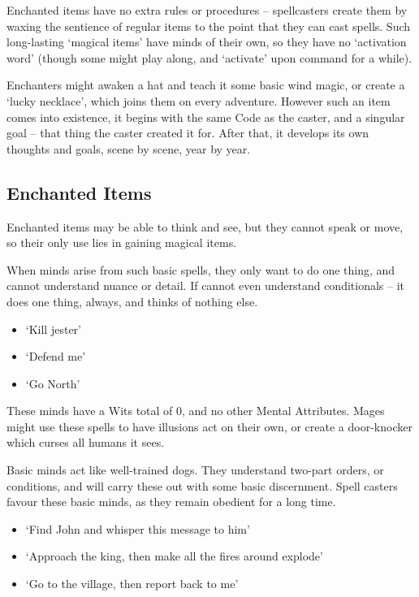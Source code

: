 \begin{multicols}{2}

Enchanted items have no extra rules or procedures -- spellcasters create them by waxing the sentience of regular items to the point that they can cast spells.
Such long-lasting `magical items' have minds of their own, so they have no `activation word' (though some might play along, and `activate' upon command for a while).

Enchanters might awaken a hat and teach it some basic wind magic, or create a `lucky necklace', which joins them on every adventure.
However such an item comes into existence, it begins with the same Code as the caster,%
and a singular goal -- that thing the caster created it for.
After that, it develops its own thoughts and goals, scene by scene, year by year.

\subsection{Enchanted Items}

Enchanted items may be able to think and see, but they cannot speak or move, so their only use lies in gaining magical items.


When minds arise from such basic spells, they only want to do one thing, and cannot understand nuance or detail.
If cannot even understand conditionals -- it does one thing, always, and thinks of nothing else.

\begin{itemize}
  \item
    `Kill jester'
  \item
    `Defend me'
  \item
    `Go North'
\end{itemize}

These minds have a Wits total of 0, and no other Mental Attributes.
Mages might use these spells to have illusions act on their own, or create a door-knocker which curses all humans it sees.


Basic minds act like well-trained dogs.
They understand two-part orders, or conditions, and will carry these out with some basic discernment.
Spell casters favour these basic minds, as they remain obedient for a long time.

\begin{itemize}
  \item
    `Find John and whisper this message to him'
  \item
    `Approach the king, then make all the fires around explode'
  \item
    `Go to the village, then report back to me'
\end{itemize}


\end{multicols}
